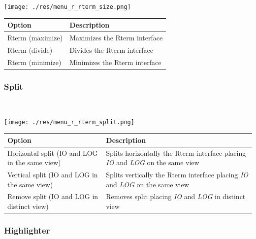 \texttt{[image: ./res/menu\_r\_rterm\_size.png]}\\

\begin{scriptsize}\begin{tabularx}{\textwidth}{>{\hsize=0.3\hsize}X>{\hsize=0.7\hsize}X}\\
    \hline
    \textbf{Option} & \textbf{Description} \\
    \hline
    Rterm (maximize) & Maximizes the Rterm interface \\
    Rterm (divide) & Divides the Rterm interface \\
    Rterm (minimize) & Minimizes the Rterm interface \\
    \hline
  \end{tabularx}\end{scriptsize}


\newpage
\hypertarget{menu_r_rterm_split}{}
\subsubsection{Split}\\

\texttt{[image: ./res/menu\_r\_rterm\_split.png]}\\

\begin{scriptsize}\begin{tabularx}{\headwidth}{>{\hsize=0.6\hsize}X>{\hsize=0.7\hsize}X}\\
    \hline
    \textbf{Option} & \textbf{Description} \\
    \hline
    Horizontal split (IO and LOG in the same view) & Splits horizontally the Rterm interface placing \textit{IO} and \textit{LOG} on the same view \\
    Vertical split (IO and LOG in the same view) & Splits vertically the Rterm interface placing \textit{IO} and \textit{LOG} on the same view \\
    Remove split (IO and LOG in distinct view) & Removes split placing \textit{IO} and \textit{LOG} in distinct view \\
    \hline
  \end{tabularx}\end{scriptsize}


\hypertarget{menu_r_rterm_highlighter}{}
\subsubsection{Highlighter}\\

